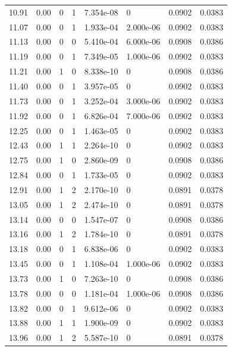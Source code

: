 \documentclass[preview]{standalone}
\begin{document}
{{{\begin{tabular}{L{1.2cm}C{1.2cm} C{0.3cm}C{0.5cm} C{1.4cm}C{1.4cm} C{1.4cm}C{1.4cm}}
  10.91  &  0.00  & 0     &  1 &  7.354e-08  & 0  & 0.0902 &  0.0383   \\ 
  11.07  &  0.00  & 0     &  1 &  1.933e-04  & 2.000e-06  & 0.0902 &  0.0383   \\ 
  11.13  &  0.00  & 0     &  0 &  5.410e-04  & 6.000e-06  & 0.0908 &  0.0386   \\ 
  11.19  &  0.00  & 0     &  1 &  7.349e-05  & 1.000e-06  & 0.0902 &  0.0383   \\ 
  11.21  &  0.00  & 1     &  0 &  8.338e-10  & 0  & 0.0908 &  0.0386   \\ 
  11.40  &  0.00  & 0     &  1 &  3.957e-05  & 0  & 0.0902 &  0.0383   \\ 
  11.73  &  0.00  & 0     &  1 &  3.252e-04  & 3.000e-06  & 0.0902 &  0.0383   \\ 
  11.92  &  0.00  & 0     &  1 &  6.826e-04  & 7.000e-06  & 0.0902 &  0.0383   \\ 
  12.25  &  0.00  & 0     &  1 &  1.463e-05  & 0  & 0.0902 &  0.0383   \\ 
  12.43  &  0.00  & 1     &  1 &  2.264e-10  & 0  & 0.0902 &  0.0383   \\ 
  12.75  &  0.00  & 1     &  0 &  2.860e-09  & 0  & 0.0908 &  0.0386   \\ 
  12.84  &  0.00  & 0     &  1 &  1.733e-05  & 0  & 0.0902 &  0.0383   \\ 
  12.91  &  0.00  & 1     &  2 &  2.170e-10  & 0  & 0.0891 &  0.0378   \\ 
  13.05  &  0.00  & 1     &  2 &  2.474e-10  & 0  & 0.0891 &  0.0378   \\ 
  13.14  &  0.00  & 0     &  0 &  1.547e-07  & 0  & 0.0908 &  0.0386   \\ 
  13.16  &  0.00  & 1     &  2 &  1.784e-10  & 0  & 0.0891 &  0.0378   \\ 
  13.18  &  0.00  & 0     &  1 &  6.838e-06  & 0  & 0.0902 &  0.0383   \\ 
  13.45  &  0.00  & 0     &  1 &  1.108e-04  & 1.000e-06  & 0.0902 &  0.0383   \\ 
  13.73  &  0.00  & 1     &  0 &  7.263e-10  & 0  & 0.0908 &  0.0386   \\ 
  13.78  &  0.00  & 0     &  0 &  1.181e-04  & 1.000e-06  & 0.0908 &  0.0386   \\ 
  13.82  &  0.00  & 0     &  1 &  9.612e-06  & 0  & 0.0902 &  0.0383   \\ 
  13.88  &  0.00  & 1     &  1 &  1.900e-09  & 0  & 0.0902 &  0.0383   \\ 
  13.96  &  0.00  & 1     &  2 &  5.587e-10  & 0  & 0.0891 &  0.0378   \\ 

\end{tabular}}}}
\end{document}
